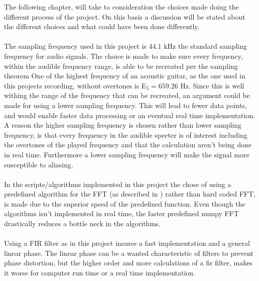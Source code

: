 The following chapter, will take to consideration the choices made doing the different process of the project.
On this basis a discussion will be stated about the different choices and what could have been done differently.
\\\\
The sampling frequency used in this project is $44.1$ kHz the standard sampling frequency for audio signals.
The choice is made to make sure every frequency, within the audible frequency range, is able to be recreated per the sampling theorem 
One of the highest frequency of an acoustic guitar, as the one used in this projects recording, without overtones is E$_5 = 659.26$ Hz.
Since this is well withing the range of the frequency that can be recreated, an argument could be made for using a lower sampling frequency.
This will lead to fewer data points, and would enable faster data processing or an eventual real time implementation. 
A reason the higher sampling frequency is chosen rather than lower sampling frequency, is that every frequency in the audible specter is of interest including the overtones of the played frequency and that the calculation aren't being done in real time.
Furthermore a lower sampling frequency will make the signal more susceptible to aliasing. %
\\\\
In the scripts/algorithms implemented in this project the chose of using a predefined algorithm for the FFT (as described in ) rather than hard coded FFT, is made due to the superior speed of the predefined function. 
Even though the algorithms isn't implemented in real time, the faster predefined numpy FFT drastically reduces a bottle neck in the algorithms.
\\\\
Using a FIR filter as in this project insures a fast implementation and a general linear phase.
The linear phase can be a wanted characteristic of filters to prevent phase distortion, but the higher order and more calculations of a fir filter, makes it worse for computer run time or a real time implementation. 
